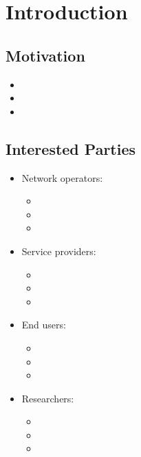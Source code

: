 
\section{Introduction}\label{sec:introduction}

\subsection{Motivation}

\begin{itemize}
\item 
\item
\item
\end{itemize}

\subsection{Interested Parties}

\begin{itemize}
\item Network operators:
\begin{itemize}
\item 
\item
\item
\end{itemize}

\item Service providers:
\begin{itemize}
\item 
\item
\item
\end{itemize}

\item End users:
\begin{itemize}
\item 
\item
\item
\end{itemize}

\item Researchers:
\begin{itemize}
\item 
\item
\item
\end{itemize}


\end{itemize}

